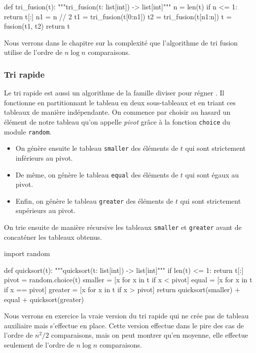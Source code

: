 \documentclass{magnolia}
\begin{document}
\begin{pythoncode}
def tri_fusion(t):
    """tri_fusion(t: list[int]) -> list[int]"""
    n = len(t)
    if n <= 1:
        return t[:]
    n1 = n // 2
    t1 = tri_fusion(t[0:n1])
    t2 = tri_fusion(t[n1:n])
    t = fusion(t1, t2)
    return t
\end{pythoncode}
\noindent
Nous verrons dans le chapitre sur la complexité que l'algorithme de tri fusion utilise de l'ordre de $n\log n$ comparaisons.

\subsubsection{Tri rapide}

Le tri rapide est aussi un algorithme de la famille \og diviser pour régner \fg.
Il fonctionne en partitionnant le tableau en deux sous-tableaux et en triant ces
tableaux de manière indépendante. On commence par choisir au hasard un élément
de notre tableau qu'on appelle \emph{pivot} grâce à la fonction \verb!choice! du
module \verb!random!.
\begin{itemize}
\item On génère ensuite le tableau \verb!smaller! des éléments de $t$ qui sont
  strictement inférieurs au pivot.
\item De même, on génère le tableau \verb!equal! des éléments de $t$ qui sont
  égaux au pivot.
\item Enfin, on génère le tableau \verb!greater! des éléments de $t$ qui sont
  strictement supérieurs au pivot.
\end{itemize}
On trie ensuite de manière récursive les tableaux \verb!smaller! et \verb!greater!
avant de concaténer les tableaux obtenus.

\begin{pythoncode}
import random 

def quicksort(t):
    """quicksort(t: list[int]) -> list[int]"""
    if len(t) <= 1:
        return t[:]
    pivot = random.choice(t)
    smaller = [x for x in t if x < pivot]
    equal = [x for x in t if x == pivot]
    greater = [x for x in t if x > pivot]
    return quicksort(smaller) + equal + quicksort(greater)
\end{pythoncode}
\noindent
Nous verrons en exercice la \og vraie \fg version du tri rapide qui ne crée pas de tableau
auxiliaire mais s'effectue en place. Cette version effectue dans le pire des cas de l'ordre de $n^2/2$ comparaisons,
mais on peut montrer qu'en moyenne, elle effectue seulement de l'ordre de $n \log n$
comparaisons.
\end{document}
